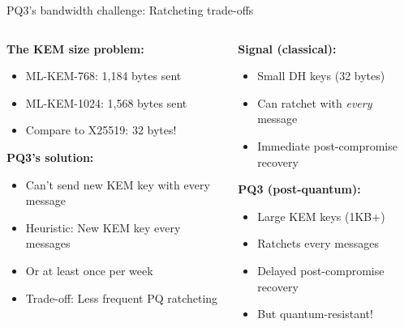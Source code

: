 \documentclass[aspectratio=169, lualatex, handout]{beamer}
\begin{document}
\begin{frame}{PQ3's bandwidth challenge: Ratcheting trade-offs}
	\begin{columns}[c]
		\begin{column}{0.55\textwidth}
			\textbf{The KEM size problem:}
			\begin{itemize}
				\item ML-KEM-768: 1,184 bytes sent
				\item ML-KEM-1024: 1,568 bytes sent
				\item Compare to X25519: 32 bytes!
			\end{itemize}
			\vspace{3mm}
			\textbf{PQ3's solution:}
			\begin{itemize}
				\item Can't send new KEM key with every message
				\item Heuristic: New KEM key every  messages
				\item Or at least once per week
				\item Trade-off: Less frequent PQ ratcheting
			\end{itemize}
		\end{column}
		\begin{column}{0.45\textwidth}
			\textbf{Signal (classical):}
			\begin{itemize}
				\item Small DH keys (32 bytes)
				\item Can ratchet with \textit{every} message
				\item Immediate post-compromise recovery
			\end{itemize}
			\vspace{3mm}
			\textbf{PQ3 (post-quantum):}
			\begin{itemize}
				\item Large KEM keys (1KB+)
				\item Ratchets every  messages
				\item Delayed post-compromise recovery
				\item But quantum-resistant!
			\end{itemize}
		\end{column}
	\end{columns}
\end{frame}
\end{document}
